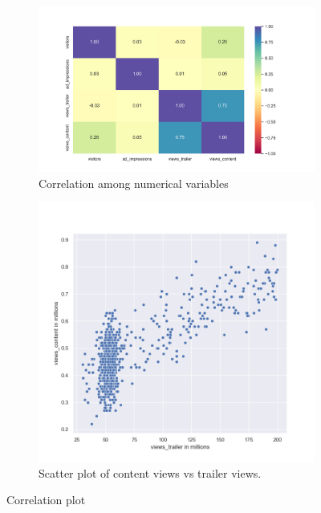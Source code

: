 \documentclass[12pt,a4paper]{style}
\begin{document}
\begin{figure}[h]
	\centering
	\begin{subfigure}[t]{0.6\textwidth}
		\includegraphics[width=\textwidth]{corr.png}
		\caption{Correlation among numerical variables}
		\label{fig:corr}
	\end{subfigure}
	\hfill
	\begin{subfigure}[t]{0.39\textwidth}
		\includegraphics[width=\textwidth]{content_vs_trailer.png}
		\caption{Scatter plot of content views vs trailer views.}
		\label{fig:content_vs_trailer}
	\end{subfigure}
	\caption{Correlation plot}
	\label{fig:correlation}
\end{figure}
\end{document}
